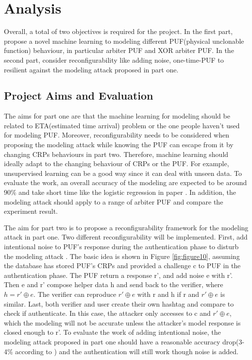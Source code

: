 \chapter{Analysis}
Overall, a total of two objectives is required for the project. In the first part, propose a novel machine learning to modeling different PUF(physical unclonable function)
behaviour, in particular arbiter PUF and XOR arbiter PUF. In the second part, consider reconfigurability like adding noise, one-time-PUF to resilient against the modeling attack
proposed in part one.

\section{Project Aims and Evaluation}
The aims for part one are that the machine learning for modeling should be related to ETA(estimated time arrival) problem or the one people haven't used for modeling
PUF. Moreover, reconfigurability needs to be considered when proposing the modeling attack while knowing the PUF can escape from it by changing CRPs behaviours in part 
two. Therefore, machine learning should ideally adapt to the changing behaviour of CRPs or the PUF. For example, unsupervised learning can be a good way since it can 
deal with unseen data. To evaluate the work, an overall accuracy of the modeling are expected to be around 90\% and take short time like the logistic regression in 
paper \cite{Reference6}. In addition, the modeling attack should apply to a range of arbiter PUF and compare the experiment result.

The aim for part two is to propose a reconfigurability framework for the modeling attack in part one. Two different reconfigurability will be implemented. First, add intentional
noise to PUF's response during the authentication phase to disturb the modeling attack \cite{Reference8}. The basic idea is shown in Figure \ref{fig:figure10}, assuming the database has stored PUF's CRPs and provided a challenge c
to PUF in the authentication phase. The PUF return a response r', and add noise e with r'. Then e and r' compose helper data h and send back to the verifier, where $h = r'\oplus e$. The verifier can reproduce $r'\oplus e$  
with r and h if r and $r'\oplus e$ is similar. Last, both verifier and user create their own hashtag and compare to check if authenticate. In this case, the attacker only accesses to c and $r'\oplus e$, which the modeling
will not be accurate unless the attacker's model response is closed enough to r'. To evaluate the work of adding intentional noise, the modeling attack proposed in part one should have a reasonable accuracy drop(3-4\% according to \cite{Reference8}) and the authentication will still work 
though noise is added.


